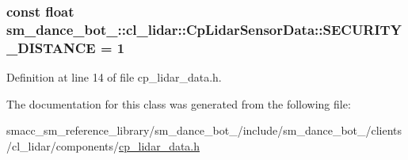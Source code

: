 \subsubsection[{\texorpdfstring{S\+E\+C\+U\+R\+I\+T\+Y\+\_\+\+D\+I\+S\+T\+A\+N\+CE}{SECURITY_DISTANCE}}]{\setlength{\rightskip}{0pt plus 5cm}const float sm\+\_\+dance\+\_\+bot\+\_\+::cl\+\_\+lidar\+::\+Cp\+Lidar\+Sensor\+Data\+::\+S\+E\+C\+U\+R\+I\+T\+Y\+\_\+\+D\+I\+S\+T\+A\+N\+CE = 1}\hypertarget{classsm__dance__bot__3_1_1cl__lidar_1_1CpLidarSensorData_a3510efc41a0ff87203041ec094fec54b}{}\label{classsm__dance__bot__3_1_1cl__lidar_1_1CpLidarSensorData_a3510efc41a0ff87203041ec094fec54b}


Definition at line 14 of file cp\+\_\+lidar\+\_\+data.\+h.



The documentation for this class was generated from the following file\+:\begin{DoxyCompactItemize}
\item 
smacc\+\_\+sm\+\_\+reference\+\_\+library/sm\+\_\+dance\+\_\+bot\+\_/include/sm\+\_\+dance\+\_\+bot\+\_/clients/cl\+\_\+lidar/components/\hyperlink{sm__dance__bot__3_2include_2sm__dance__bot__3_2clients_2cl__lidar_2components_2cp__lidar__data_8h}{cp\+\_\+lidar\+\_\+data.\+h}\end{DoxyCompactItemize}

